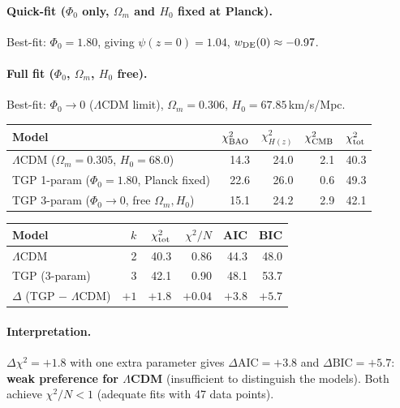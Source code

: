 \paragraph{Quick-fit ($\Phi_0$ only, $\Omega_m$ and $H_0$ fixed at Planck).}
Best-fit: $\Phi_0 = 1.80$, giving $\psi(z=0) = 1.04$, $w_{\rm DE}(0) \approx -0.97$.

\paragraph{Full fit ($\Phi_0$, $\Omega_m$, $H_0$ free).}
Best-fit: $\Phi_0 \to 0$ ($\Lambda$CDM limit), $\Omega_m = 0.306$, $H_0 = 67.85$\,km/s/Mpc.

\begin{center}
\begin{tabular}{@{}lrrrr@{}}
\toprule
\textbf{Model} & $\chi^2_{\rm BAO}$ & $\chi^2_{H(z)}$ & $\chi^2_{\rm CMB}$ & $\chi^2_{\rm tot}$ \\
\midrule
$\Lambda$CDM ($\Omega_m = 0.305$, $H_0 = 68.0$) & 14.3 & 24.0 & 2.1 & 40.3 \\
TGP 1-param ($\Phi_0 = 1.80$, Planck fixed)      & 22.6 & 26.0 & 0.6 & 49.3 \\
TGP 3-param ($\Phi_0 \to 0$, free $\Omega_m, H_0$) & 15.1 & 24.2 & 2.9 & 42.1 \\
\bottomrule
\end{tabular}
\end{center}

\begin{center}
\begin{tabular}{@{}lrrrrr@{}}
\toprule
\textbf{Model} & $k$ & $\chi^2_{\rm tot}$ & $\chi^2/N$ & AIC & BIC \\
\midrule
$\Lambda$CDM & 2 & 40.3 & 0.86 & 44.3 & 48.0 \\
TGP (3-param) & 3 & 42.1 & 0.90 & 48.1 & 53.7 \\
\midrule
$\Delta$ (TGP $-$ $\Lambda$CDM) & $+1$ & $+1.8$ & $+0.04$ & $+3.8$ & $+5.7$ \\
\bottomrule
\end{tabular}
\end{center}

\paragraph{Interpretation.}
$\Delta\chi^2 = +1.8$ with one extra parameter gives
$\Delta\text{AIC} = +3.8$ and $\Delta\text{BIC} = +5.7$:
\textbf{weak preference for $\Lambda$CDM} (insufficient to
distinguish the models).  Both achieve $\chi^2/N < 1$
(adequate fits with 47 data points).

